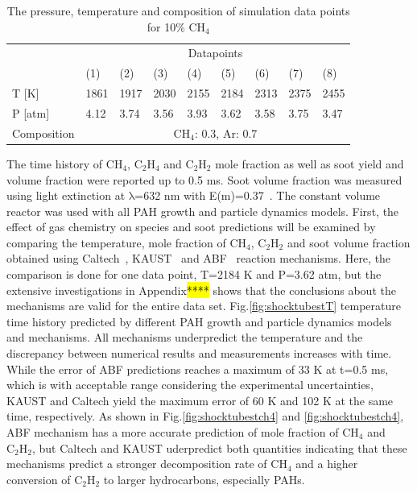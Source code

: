 \begin{table}[]
	\caption{The pressure, temperature and composition of simulation data points for 10\% $\mathrm{CH_4}$}
	\centering
	\begin{tabular}{l|llllllll|}
		\cline{2-9}
     	& \multicolumn{8}{c|}{Datapoints}                       \\ \cline{2-9} 
		& (1)  & (2)  & (3)  & (4)  & (5)  & (6)  & (7)  & (8)  \\ \hline
		\multicolumn{1}{|l|}{T {[}K{]}}   & 1861 & 1917 & 2030 & 2155 & 2184 & 2313 & 2375 & 2455 \\ \hline
		\multicolumn{1}{|l|}{P {[}atm{]}} & 4.12 & 3.74 & 3.56 & 3.93 & 3.62 & 3.58 & 3.75 & 3.47 \\ \hline
		\multicolumn{1}{|l|}{Composition} & \multicolumn{8}{c|}{$\mathrm{CH_4}$: 0.3, Ar: 0.7}               \\ \hline
	\end{tabular}
	\label{tab:shocktubest_CH4_30} 
\end{table}

 The time history of $\mathrm{CH_4}$, $\mathrm{C_2H_4}$ and $\mathrm{C_2H_2}$ mole fraction as well as soot yield and volume fraction were reported up to 0.5 ms. Soot volume fraction was measured using light extinction at $\mathrm{\lambda}$=632 nm with E(m)=0.37~\citep{agafonov2015soot}. The constant volume reactor was used with all PAH growth and particle dynamics models. First, the effect of gas chemistry on species and soot predictions will be examined by comparing the temperature, mole fraction of $\mathrm{CH_4}$, $\mathrm{C_2H_2}$ and soot volume fraction obtained using Caltech~\citep{blanquart2009chemical}, KAUST~\cite{wang2013pah} and ABF~\citep{appel2000kinetic} reaction mechanisms. Here, the comparison is done for one data point, T=2184 K and P=3.62 atm, but the extensive investigations in Appendix\hl{****} shows that the conclusions about the mechanisms are valid for the entire data set. Fig.\ref{fig:shocktubestT} temperature time history predicted by different PAH growth and particle dynamics models and mechanisms. All mechanisms underpredict the temperature and the discrepancy between numerical results and measurements increases with time. While the error of ABF predictions reaches a maximum of 33 K at t=0.5 ms, which is with acceptable range considering the experimental uncertainties, KAUST and Caltech yield the maximum error of 60 K and 102 K at the same time, respectively. As shown in Fig.\ref{fig:shocktubestch4} and \ref{fig:shocktubestch4}, ABF mechanism has a more accurate prediction of mole fraction of $\mathrm{CH_4}$ and $\mathrm{C_2H_2}$, but Caltech and KAUST uderpredict both quantities indicating that these mechanisms predict a stronger  decomposition rate of $\mathrm{CH_4}$ and a higher conversion of $\mathrm{C_2H_2}$ to larger hydrocarbons, especially PAHs. 

